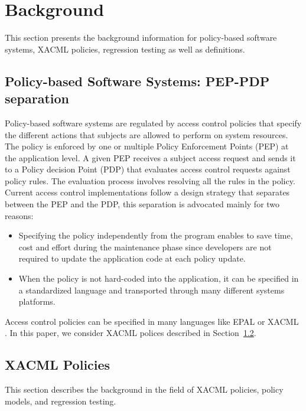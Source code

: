 
  
\section{Background}
\label{sec:background}
This section presents the background information for policy-based software systems, XACML policies, regression testing
as well as definitions.

\subsection{Policy-based Software Systems: PEP-PDP separation}
Policy-based software systems are regulated by access control policies that specify the different actions that subjects are allowed to perform on system resources. 
The policy is enforced by one or multiple Policy Enforcement Points (PEP) at the application level. A given PEP receives a subject access request and 
sends it to a Policy decision Point (PDP) that evaluates access control requests against policy rules. The evaluation process involves resolving all the rules in the policy. 
Current access control implementations follow a design strategy that separates between the PEP and the PDP, this separation is advocated mainly for two reasons:
\begin{itemize}
\item Specifying the policy independently from the program enables to save time, cost and effort during the maintenance phase since developers are not required 
to update the application code at each policy update.
\item When the policy is not hard-coded into the application, it can be specified in a standardized language and transported through many different systems platforms.
\end{itemize}
Access control policies can be specified in many languages like EPAL \cite{epal} or XACML \cite {oasis05:xacml}. 
In this paper, we consider XACML polices described in Section~\ref{sec:xacmlpolicies}.


\subsection{XACML Policies} \label{sec:xacmlpolicies}
This section describes the background in the field of XACML policies, policy models, and regression testing.


